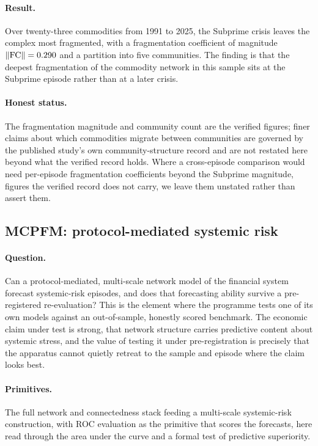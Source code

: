 \paragraph{Result.} Over twenty-three commodities from 1991 to 2025, the Subprime
crisis leaves the complex most fragmented, with a fragmentation coefficient of
magnitude $\lVert \text{FC} \rVert = 0.290$ and a partition into five communities. The
finding is that the deepest fragmentation of the commodity network in this sample
sits at the Subprime episode rather than at a later crisis.

\paragraph{Honest status.} The fragmentation magnitude and community count are
the verified figures; finer claims about which commodities migrate between
communities are governed by the published study's own community-structure record
and are not restated here beyond what the verified record holds. Where a
cross-episode comparison would need per-episode fragmentation coefficients beyond
the Subprime magnitude, figures the verified record does not carry, we leave them
unstated rather than assert them.

\subsection{MCPFM: protocol-mediated systemic risk}
\label{sec:elem-mcpfm}

\paragraph{Question.} Can a protocol-mediated, multi-scale network model of the
financial system forecast systemic-risk episodes, and does that forecasting
ability survive a pre-registered re-evaluation? This is the element where the
programme tests one of its own models against an out-of-sample, honestly scored
benchmark. The economic claim under test is strong, that network structure
carries predictive content about systemic stress, and the value of testing it
under pre-registration is precisely that the apparatus cannot quietly retreat to
the sample and episode where the claim looks best.

\paragraph{Primitives.} The full network and connectedness stack feeding a
multi-scale systemic-risk construction, with ROC evaluation as the primitive that
scores the forecasts, here read through the area under the curve and a formal
test of predictive superiority.

